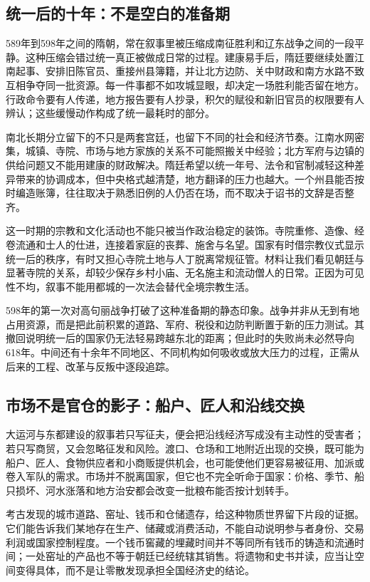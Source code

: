 \subsection{统一后的十年：不是空白的准备期}
589年到598年之间的隋朝，常在叙事里被压缩成南征胜利和辽东战争之间的一段平静。这种压缩会错过统一真正被做成日常的过程。建康易手后，隋廷要继续处置江南起事、安排旧陈官员、重接州县簿籍，并让北方边防、关中财政和南方水路不致互相争夺同一批资源。每一件事都不如攻城显眼，却决定一场胜利能否留在地方。行政命令要有人传递，地方报告要有人抄录，积欠的赋役和新旧官员的权限要有人辨认；这些缓慢动作构成了统一最耗时的部分。

南北长期分立留下的不只是两套宫廷，也留下不同的社会和经济节奏。江南水网密集，城镇、寺院、市场与地方家族的关系不可能照搬关中经验；北方军府与边镇的供给问题又不能用建康的财政解决。隋廷希望以统一年号、法令和官制减轻这种差异带来的协调成本，但中央格式越清楚，地方翻译的压力也越大。一个州县能否按时编造账簿，往往取决于熟悉旧例的人仍否在场，而不取决于诏书的文辞是否整齐。

这一时期的宗教和文化活动也不能只被当作政治稳定的装饰。寺院重修、造像、经卷流通和士人的仕进，连接着家庭的丧葬、施舍与名望。国家有时借宗教仪式显示统一后的秩序，有时又担心寺院土地与人丁脱离常规征管。材料让我们看见朝廷与显著寺院的关系，却较少保存乡村小庙、无名施主和流动僧人的日常。正因为可见性不均，叙事不能用都城的一次法会替代全境宗教生活。

598年的第一次对高句丽战争打破了这种准备期的静态印象。战争并非从无到有地占用资源，而是把此前积累的道路、军府、税役和边防判断置于新的压力测试。其撤回说明统一后的国家仍无法轻易跨越东北的距离；但此时的失败尚未必然导向618年。中间还有十余年不同地区、不同机构如何吸收或放大压力的过程，正需从后来的工程、改革与反叛中逐段追踪。

\subsection{市场不是官仓的影子：船户、匠人和沿线交换}
大运河与东都建设的叙事若只写征夫，便会把沿线经济写成没有主动性的受害者；若只写商贸，又会忽略征发和风险。渡口、仓场和工地附近出现的交换，既可能为船户、匠人、食物供应者和小商贩提供机会，也可能使他们更容易被征用、加派或卷入军队的需求。市场并不脱离国家，但它也不完全听命于国家：价格、季节、船只损坏、河水涨落和地方治安都会改变一批粮布能否按计划转手。

考古发现的城市道路、窑址、钱币和仓储遗存，给这种物质世界留下片段的证据。它们能告诉我们某地存在生产、储藏或消费活动，不能自动说明参与者身份、交易利润或国家控制程度。一个钱币窖藏的埋藏时间并不等同所有钱币的铸造和流通时间；一处窑址的产品也不等于朝廷已经统辖其销售。将遗物和史书并读，应当让空间变得具体，而不是让零散发现承担全国经济史的结论。

